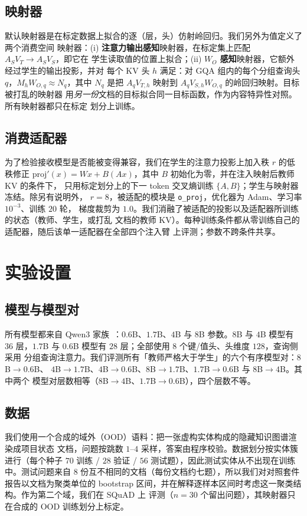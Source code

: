 \documentclass[11pt]{article}
\begin{document}
\subsection{映射器}
\label{sec:mappers}
默认映射器是在标定数据上拟合的逐（层，头）仿射岭回归。我们另外为值定义了两个消费空间
映射器：(i) \textbf{注意力输出感知}映射器，在标定集上匹配 $A_S V_T \to A_S V_S$，即它在
学生读取值的位置上拟合；(ii) \textbf{$W_O$ 感知}映射器，它额外经过学生的输出投影，并对
每个 KV 头 $h$ 满足：对 GQA 组内的每个分组查询头 $q$，$M_h W_{O,q} \approx N_q$，其中
$N_q$ 是把 $A_q V_{T,h}$ 映射到 $A_q V_{S,h} W_{O,q}$ 的岭回归映射。目标被打乱的映射器
用\emph{另一份}文档的目标拟合同一目标函数，作为内容特异性对照。所有映射器都只在标定
划分上训练。

\subsection{消费适配器}
\label{sec:adapter}
为了检验接收模型是否能被变得兼容，我们在学生的注意力投影上加入秩 $r$ 的低秩修正
$\mathrm{proj}'(x)=Wx+B(Ax)$，其中 $B$ 初始化为零，并在注入映射后教师 KV 的条件下，
只用标定划分上的下一 token 交叉熵训练 $\{A,B\}$；学生与映射器冻结。除另有说明外，
$r=8$，被适配的模块是 \texttt{o\_proj}，优化器为 Adam、学习率 $10^{-3}$、训练 $20$ 轮，
梯度裁剪为 $1.0$。我们消融了被适配的投影以及适配器所训练的状态（教师、学生，或打乱
文档的教师 KV）。每种训练条件都从零训练自己的适配器，随后该单一适配器在全部四个注入臂
上评测；参数不跨条件共享。
\section{实验设置}

\subsection{模型与模型对}
\label{sec:models}
所有模型都来自 Qwen3 家族~\cite{qwen3report2025}：$0.6$B、$1.7$B、$4$B 与 $8$B 参数。$8$B 与 $4$B 模型有 $36$
层，$1.7$B 与 $0.6$B 模型有 $28$ 层；全部使用 $8$ 个键/值头、头维度 $128$，查询侧采用
分组查询注意力。我们评测所有「教师严格大于学生」的六个有序模型对：$8$B$\to0.6$B、
$4$B$\to1.7$B、$4$B$\to0.6$B、$8$B$\to1.7$B、$1.7$B$\to0.6$B 与 $8$B$\to4$B。其中两个
模型对层数相等（$8$B$\to4$B、$1.7$B$\to0.6$B），四个层数不等。

\subsection{数据}
\label{sec:data}
我们使用一个合成的域外（OOD）语料：把一张虚构实体构成的隐藏知识图谱渲染成项目状态
文档，问题按跳数 $1$--$4$ 采样，答案由程序校验。数据划分按实体簇进行（每个种子
$70$ 训练 / $28$ 验证 / $56$ 测试题），因此测试实体从不出现在训练中。测试问题来自
$8$ 份互不相同的文档（每份文档约七题），所以我们对对照套件报告以文档为聚类单位的
bootstrap 区间，并在解释逐样本区间时考虑这一聚类结构。作为第二个域，我们在 SQuAD 上
评测（$n=30$ 个留出问题），其映射器只在合成的 OOD 训练划分上标定。
\end{document}
